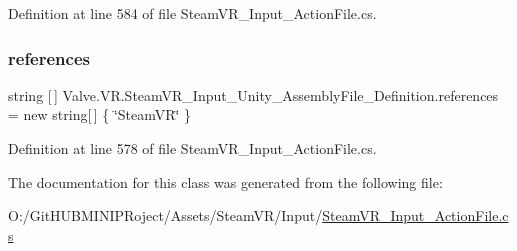 Definition at line 584 of file Steam\+V\+R\+\_\+\+Input\+\_\+\+Action\+File.\+cs.

\mbox{\label{class_valve_1_1_v_r_1_1_steam_v_r___input___unity___assembly_file___definition_a9078f7cc911b68ca61c279deb69c8d8d}} 
\subsubsection{\texorpdfstring{references}{references}}
{\footnotesize\ttfamily string \mbox{[}$\,$\mbox{]} Valve.\+V\+R.\+Steam\+V\+R\+\_\+\+Input\+\_\+\+Unity\+\_\+\+Assembly\+File\+\_\+\+Definition.\+references = new string\mbox{[}$\,$\mbox{]} \{ \char`\"{}Steam\+VR\char`\"{} \}}



Definition at line 578 of file Steam\+V\+R\+\_\+\+Input\+\_\+\+Action\+File.\+cs.



The documentation for this class was generated from the following file\+:\begin{DoxyCompactItemize}
\item 
O\+:/\+Git\+H\+U\+B\+M\+I\+N\+I\+P\+Roject/\+Assets/\+Steam\+V\+R/\+Input/\mbox{\hyperlink{_steam_v_r___input___action_file_8cs}{Steam\+V\+R\+\_\+\+Input\+\_\+\+Action\+File.\+cs}}\end{DoxyCompactItemize}
